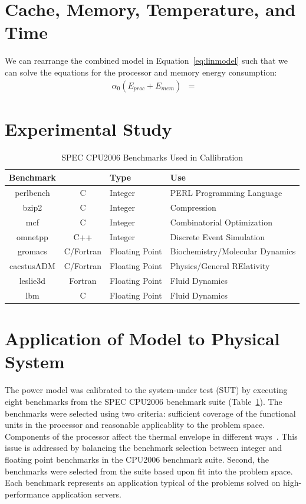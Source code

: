 \documentclass[12pt,onecolumn]{ULieeetran}
\begin{document}
\section{Cache, Memory, Temperature, and Time}
\label{sec:timemodel}

We can rearrange the combined model in Equation~\ref{eq:linmodel} such
that we can solve the equations for the processor and memory energy
consumption:
\begin{align*}
  \alpha_0 (E_{proc} + E_{mem}) &= 
\end{align*}



\section{Experimental Study}
\label{sec:experiment}
\begin{table}
  \centering
  \caption{SPEC CPU2006 Benchmarks Used in Callibration}
  \label{tab:specbenchs}
  \begin{tabular}{c c l l}
    \hline
    Benchmark& &Type&Use\\
    \hline
    perlbench&C&Integer&PERL Programming Language\\
    bzip2&C&Integer&Compression\\
    mcf&C&Integer&Combinatorial Optimization\\
    omnetpp&C++&Integer&Discrete Event Simulation\\
    \hline
    gromacs&C/Fortran&Floating Point&Biochemistry/Molecular Dynamics\\
    cacstusADM&C/Fortran&Floating Point&Physics/General RElativity\\
    leslie3d&Fortran&Floating Point&Fluid Dynamics\\
    lbm&C&Floating Point&Fluid Dynamics\\
    \hline \hline
  \end{tabular}
\end{table}
\section{Application of Model to Physical System}
\label{sec:application}
The power model was calibrated to the system-under test (SUT) by
executing eight benchmarks from the SPEC CPU2006 benchmark suite
(Table~\ref{tab:specbenchs}). The benchmarks were selected using two
criteria: sufficient coverage of the functional units in the processor
and reasonable applicablity to the problem space.  Components of the
processor affect the thermal envelope in different
ways~\cite{Kumar2008}.  This issue is addressed by balancing the
benchmark selection between integer and floating point benchmarks in the
CPU2006 benchmark suite.  Second, the benchmarks were selected from the
suite based upon fit into the problem space.  Each benchmark represents
an application typical of the problems solved on high-performance
application servers.
\end{document}
